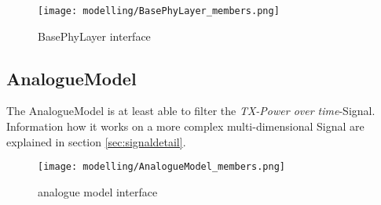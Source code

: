 \label{SignalCreation}

\begin{figure}[H]
 \centering
 \texttt{[image: modelling/BasePhyLayer\_members.png]}
 \caption{BasePhyLayer interface}
 \label{fig: BasePhyLayer interface}
\end{figure}



\subsection{AnalogueModel}



%

The AnalogueModel is at least able to filter the \emph{TX-Power over
time}-Signal.\\

Information how it works on a more complex multi-dimensional Signal are
explained in section \ref{sec:signaldetail}.
 
\begin{figure}[H]
 \centering
 \texttt{[image: modelling/AnalogueModel\_members.png]}
 \caption{analogue model interface}
 \label{fig: analogue model interface}
\end{figure}
%

